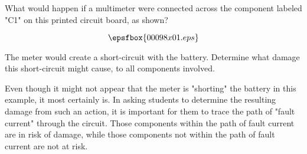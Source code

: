 

What would happen if a multimeter were connected across the component labeled "C1" on this printed circuit board, as shown?

$$\epsfbox{00098x01.eps}$$







The meter would create a short-circuit with the battery.  Determine what damage this short-circuit might cause, to all components involved.







Even though it might not appear that the meter is "shorting" the battery in this example, it most certainly is.  In asking students to determine the resulting damage from such an action, it is important for them to trace the path of "fault current" through the circuit.  Those components within the path of fault current are in risk of damage, while those components not within the path of fault current are not at risk.




